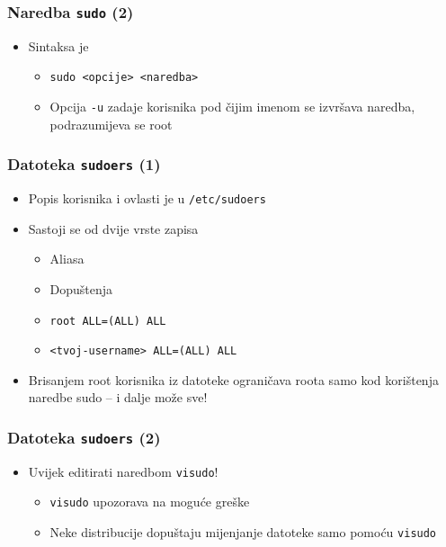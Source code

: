 \documentclass[table,usenames,dvipsnames]{beamer}
\newcommand{\shell}[1]{\texttt{#1}}
\begin{document}
\begin{frame}[t]
\frametitle{Naredba \shell{sudo} (2)}
\begin{itemize}
  \item Sintaksa je
  \begin{itemize}
    \item[] \shell{sudo <opcije> <naredba>}
    \item Opcija \shell{-u} zadaje korisnika pod čijim imenom se izvršava 
          naredba, podrazumijeva se root
  \end{itemize}
\end{itemize}
\end{frame}

\begin{frame}[t]
\frametitle{Datoteka \shell{sudoers} (1)}
\begin{itemize}
  \item Popis korisnika i ovlasti je u \shell{/etc/sudoers}
  \item Sastoji se od dvije vrste zapisa
  \begin{itemize}
    \item Aliasa
    \item Dopuštenja
    \item[] \shell{root\hspace{5pt}    ALL=(ALL) ALL}
    \item[] \shell{<tvoj-username>   ALL=(ALL) ALL}
  \end{itemize}
  \item Brisanjem root korisnika iz datoteke ograničava roota samo kod 
        korištenja naredbe sudo -- i dalje može sve!
\end{itemize}
\end{frame}

\begin{frame}[t]
\frametitle{Datoteka \shell{sudoers} (2)}
\begin{itemize}
  \item Uvijek editirati naredbom \shell{visudo}!
  \begin{itemize}
    \item \shell{visudo} upozorava na moguće greške
    \item Neke distribucije dopuštaju mijenjanje datoteke samo pomoću 
          \shell{visudo}
  \end{itemize}
\end{itemize}
\end{frame}
\end{document}
